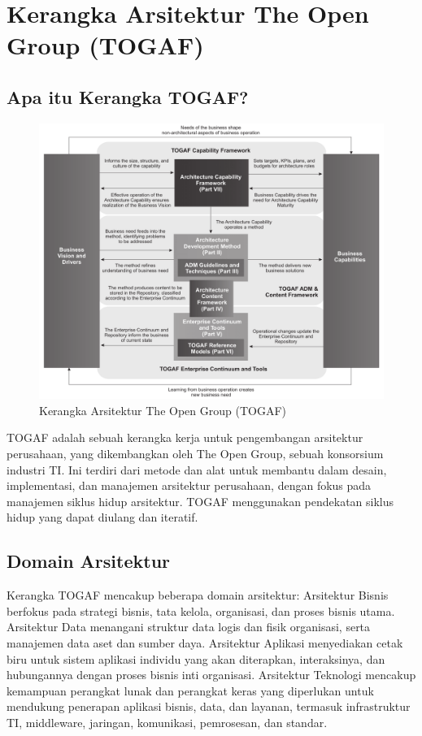 \chapter{Kerangka Arsitektur The Open Group (TOGAF)}

\section{Apa itu Kerangka TOGAF?}

\begin{figure}[h]
	\begin{center}
		\includegraphics[width=\textwidth]{../figures/togaf}
		\caption{Kerangka Arsitektur The Open Group (TOGAF)}
	\end{center}
\end{figure}

TOGAF adalah sebuah kerangka kerja untuk pengembangan arsitektur perusahaan, yang dikembangkan oleh The Open Group, sebuah konsorsium industri TI. Ini terdiri dari metode dan alat untuk membantu dalam desain, implementasi, dan manajemen arsitektur perusahaan, dengan fokus pada manajemen siklus hidup arsitektur. TOGAF menggunakan pendekatan siklus hidup yang dapat diulang dan iteratif.

\section{Domain Arsitektur}
Kerangka TOGAF mencakup beberapa domain arsitektur: Arsitektur Bisnis berfokus pada strategi bisnis, tata kelola, organisasi, dan proses bisnis utama. Arsitektur Data menangani struktur data logis dan fisik organisasi, serta manajemen data aset dan sumber daya. Arsitektur Aplikasi menyediakan cetak biru untuk sistem aplikasi individu yang akan diterapkan, interaksinya, dan hubungannya dengan proses bisnis inti organisasi. Arsitektur Teknologi mencakup kemampuan perangkat lunak dan perangkat keras yang diperlukan untuk mendukung penerapan aplikasi bisnis, data, dan layanan, termasuk infrastruktur TI, middleware, jaringan, komunikasi, pemrosesan, dan standar.

